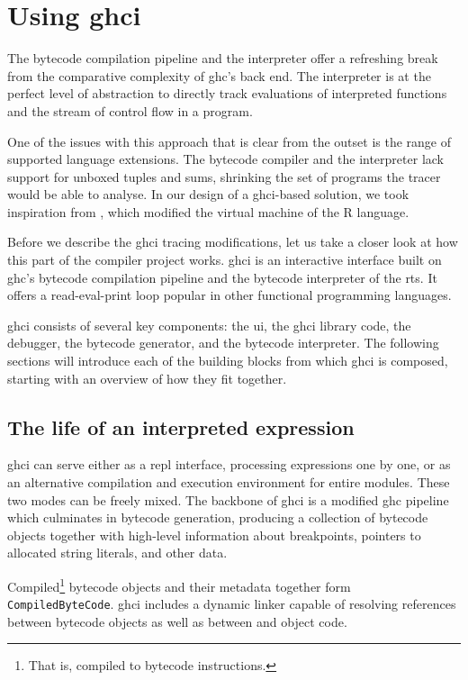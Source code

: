 \documentclass[thesis=B,english]{FITthesis}[2019/12/23]
\newcommand{\hsType}[1]{\texttt{#1}}
\begin{document}
\section{Using \acrshort{ghci}} \label{sec:using-ghci}
The bytecode compilation pipeline and the interpreter offer a refreshing break
from the comparative complexity of \acrshort{ghc}'s back end. The interpreter
is at the perfect level of abstraction to directly track evaluations of
interpreted functions and the stream of control flow in a program.

One of the issues with this approach that is clear from the outset is the range
of supported language extensions. The bytecode compiler and the interpreter
lack support for un\-box\-ed tuples and sums, shrinking the set of programs the
tracer would be able to analyse. In our design of a \acrshort{ghci}-based
solution, we took inspiration from \cite{emp-study-laziness-r}, which modified
the virtual machine of the R language.

Before we describe the \acrshort{ghci} tracing modifications, let us take a
closer look at how this part of the compiler project works. \acrshort{ghci} is
an interactive interface built on \acrshort{ghc}'s bytecode compilation
pipeline and the bytecode interpreter of the \acrshort{rts}. It offers a
read-eval-print loop popular in other functional programming languages.

\acrshort{ghci} consists of several key components: the \acrshort{ui}, the
\acrshort{ghci} library code, the debugger, the bytecode generator, and the
bytecode interpreter. The following sections will introduce each of the
building blocks from which \acrshort{ghci} is composed, starting with an
overview of how they fit together.

\subsection*{The life of an interpreted expression}
\acrshort{ghci} can serve either as a \acrshort{repl} interface, processing
expressions one by one, or as an alternative compilation and execution
environment for entire modules. These two modes can be freely mixed. The
backbone of \acrshort{ghci} is a modified \acrshort{ghc} pipeline which
culminates in bytecode generation, producing a collection of bytecode objects
together with high-level information about breakpoints, pointers to allocated
string literals, and other data.

Compiled\footnote{That is, compiled to bytecode instructions.} bytecode objects
and their metadata together form \hsType{CompiledByteCode}. \acrshort{ghci}
includes a dynamic linker capable of resolving references between bytecode
objects as well as between  and object code.
\end{document}
